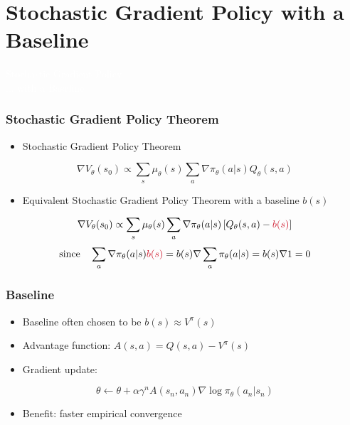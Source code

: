 \documentclass[11pt,table]{beamer}
\begin{document}
\section{Stochastic Gradient Policy with a Baseline}
{
\begin{frame}
\centering
\Huge
\textcolor{white}{Stochastic Gradient Policy\\... with a Baseline}
\thispagestyle{empty}
\end{frame}
}


\begin{frame}
\frametitle{Stochastic Gradient Policy Theorem}

\begin{itemize}
    \item Stochastic Gradient Policy Theorem
\end{itemize}

\[
\nabla V_\theta(s_0) \propto \sum_s \mu_\theta(s) \sum_a \nabla \pi_\theta(a|s) Q_\theta(s,a)
\]

\begin{itemize}
    \item Equivalent Stochastic Gradient Policy Theorem with a baseline \( b(s) \)
\end{itemize}

\[
\nabla V_\theta(s_0) \propto \sum_s \mu_\theta(s) \sum_a \nabla \pi_\theta(a|s) \left[ Q_\theta(s,a) - \textcolor{red1}{b(s)} \right]
\]
\footnotesize
\[
\text{since} \quad \sum_a \nabla \pi_\theta(a|s) \textcolor{red1}{b(s)} = b(s) \nabla \sum_a \pi_\theta(a|s) = b(s) \nabla 1 = 0
\]

\end{frame}



\begin{frame}
\frametitle{Baseline}

\begin{itemize}
    \item Baseline often chosen to be \( b(s) \approx V^\pi(s) \)
    \item Advantage function: \( A(s,a) = Q(s,a) - V^\pi(s) \)
    \item Gradient update:
\end{itemize}

\[
\theta \leftarrow \theta + \alpha \gamma^n A(s_n, a_n) \nabla \log \pi_\theta(a_n|s_n)
\]

\begin{itemize}
    \item Benefit: faster empirical convergence
\end{itemize}

\end{frame}
\end{document}
